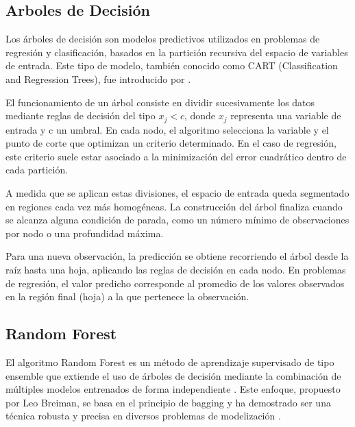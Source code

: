\subsection{Arboles de Decisión}

Los árboles de decisión son modelos predictivos utilizados en problemas de regresión y clasificación, basados en la partición recursiva del espacio de variables de entrada. Este tipo de modelo, también conocido como CART (Classification and Regression Trees), fue introducido por \citet{breiman1984}.

El funcionamiento de un árbol consiste en dividir sucesivamente los datos mediante reglas de decisión del tipo $x_j <c$, donde $x_j$  representa una variable de entrada y c un umbral. En cada nodo, el algoritmo selecciona la variable y el punto de corte que optimizan un criterio determinado. En el caso de regresión, este criterio suele estar asociado a la minimización del error cuadrático dentro de cada partición.

A medida que se aplican estas divisiones, el espacio de entrada queda segmentado en regiones cada vez más homogéneas. La construcción del árbol finaliza cuando se alcanza alguna condición de parada, como un número mínimo de observaciones por nodo o una profundidad máxima.

Para una nueva observación, la predicción se obtiene recorriendo el árbol desde la raíz hasta una hoja, aplicando las reglas de decisión en cada nodo. En problemas de regresión, el valor predicho corresponde al promedio de los valores observados en la región final (hoja) a la que pertenece la observación.

\subsection{Random Forest}

El algoritmo Random Forest es un método de aprendizaje supervisado de tipo ensemble que extiende el uso de árboles de decisión mediante la combinación de múltiples modelos entrenados de forma independiente \citep{louppe2015, salman2024}. Este enfoque, propuesto por Leo Breiman, se basa en el principio de bagging y ha demostrado ser una técnica robusta y precisa en diversos problemas de modelización \citep{cutler2011}.

